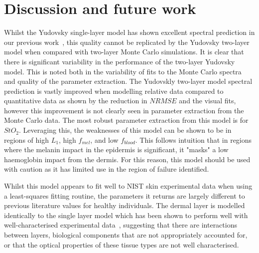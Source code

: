 \section{Discussion and future work}\label{sec:discussion2}
Whilst the Yudovsky single-layer model has shown excellent spectral prediction in our previous work~\citep{Bahl2023a}, this quality cannot be replicated by the Yudovsky two-layer model when compared with two-layer Monte Carlo simulations. It is clear that there is significant variability in the performance of the two-layer Yudovsky model. This is noted both in the variability of fits to the Monte Carlo spectra and quality of the parameter extraction. The Yudovskly two-layer model spectral prediction is vastly improved when modelling relative data compared to quantitative data as shown by the reduction in $NRMSE$ and the visual fits, however this improvement is not clearly seen in parameter extraction from the Monte Carlo data. The most robust parameter extraction from this model is for $StO_2$. Leveraging this, the weaknesses of this model can be shown to be in regions of high $L_1$, high $f_{mel}$, and low $f_{blood}$. This follows intuition that in regions where the melanin impact in the epidermis is significant, it "masks" a low haemoglobin impact from the dermis. For this reason, this model should be used with caution as it has limited use in the region of failure identified.

Whilst this model appears to fit well to NIST skin experimental data when using a least-squares fitting routine, the parameters it returns are largely different to previous literature values for healthy individuals. The dermal layer is modelled identically to the single layer model which has been shown to perform well with well-characterised experimental data~\citep{Bahl2023a}, suggesting that there are interactions between layers, biological components that are not appropriately accounted for, or that the optical properties of these tissue types are not well characterised.  

